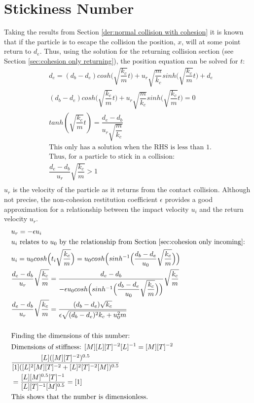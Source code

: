\documentclass[a4paper,11pt,titlepage]{report}
\begin{document}
\section{Stickiness Number}
\label{der:stickiness number}
Taking the results from Section \ref{der:normal collision with cohesion} it is known that if the particle is to escape the collision the position, $x$, will at some point return to $d_e$. Thus, using the solution for the returning collision section (see Section \ref{sec:cohesion only returning}), the position equation can be solved for $t$:
\begin{align*}
&d_e = (d_b - d_e)cosh\Big(\sqrt{\dfrac{k_c}{m}} t\Big) + u_r \sqrt{\dfrac{m}{k_c}} sinh\Big(\sqrt{\dfrac{k_c}{m}}t\Big) + d_e \\
&(d_b - d_e)cosh\Big(\sqrt{\dfrac{k_c}{m}} t\Big) + u_r \sqrt{\dfrac{m}{k_c}} sinh\Big(\sqrt{\dfrac{k_c}{m}}t\Big) = 0 \\
&tanh(\sqrt{\dfrac{k_c}{m}} t) = \dfrac{d_e - d_b}{u_r \sqrt{\dfrac{m}{k_c}}} \\
&\text{This only has a solution when the RHS is less than 1.} \\
&\text{Thus, for a particle to stick in a collision:} \\
&\dfrac{d_e - d_b}{u_r}\sqrt{\dfrac{k_c}{m}} > 1 \\
\end{align*}
$u_r$ is the velocity of the particle as it returns from the contact collision. Although not precise, the non-cohesion restitution coefficient $\epsilon$ provides a good approximation for a relationship between the impact velocity $u_i$ and the return velocity $u_r$.
\begin{align*}
&u_r = -\epsilon u_i \\
&\text{$u_i$ relates to $u_0$ by the relationship from Section \ref{sec:cohesion only incoming}:} \\
&u_i = u_0 cosh\Big(t_i \sqrt{\dfrac{k_c}{m}}\Big) = u_0 cosh\Big(sinh^{-1}\Big(\dfrac{d_b - d_e}{u_0}\sqrt{\dfrac{k_c}{m}}\Big)\Big) \\
&\dfrac{d_e - d_b}{u_r}\sqrt{\dfrac{k_c}{m}} = \dfrac{d_e - d_b}{-\epsilon u_0 cosh\Big(sinh^{-1}\Big(\dfrac{d_b - d_e}{u_0}\sqrt{\dfrac{k_c}{m}}\Big)\Big)}\sqrt{\dfrac{k_c}{m}} \\
&\dfrac{d_e - d_b}{u_r}\sqrt{\dfrac{k_c}{m}} = \dfrac{(d_b - d_e)\sqrt{k_c}}{\epsilon \sqrt{(d_b - d_e)^2 k_c + u_0 ^ 2 m}} \\\\
&\text{Finding the dimensions of this number:} \\
&\text{Dimensions of stiffness: } [M][L][T]^{-2}[L]^{-1} = [M][T]^{-2} \\
&\dfrac{[L]([M][T]^{-2})^{0.5}}{[1]([L]^2[M][T]^{-2} + [L]^2[T]^{-2}[M])^{0.5}} \\
& = \dfrac{[L][M]^{0.5}[T]^{-1}}{[L][T]^{-1}[M]^{0.5}} = [1] \\
&\text{This shows that the number is dimensionless.}
\end{align*}
\end{document}
